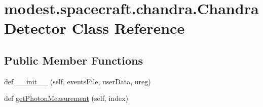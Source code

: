 \hypertarget{classmodest_1_1spacecraft_1_1chandra_1_1ChandraDetector}{}\section{modest.\+spacecraft.\+chandra.\+Chandra\+Detector Class Reference}
\label{classmodest_1_1spacecraft_1_1chandra_1_1ChandraDetector}
\subsection*{Public Member Functions}
\begin{DoxyCompactItemize}
\item 
def \hyperlink{classmodest_1_1spacecraft_1_1chandra_1_1ChandraDetector_a15d9e87637981cfaef03dfc955f081ef}{\+\_\+\+\_\+init\+\_\+\+\_\+} (self, events\+File, user\+Data, ureg)
\item 
def \hyperlink{classmodest_1_1spacecraft_1_1chandra_1_1ChandraDetector_ab4230e87a9e24ad26003b07e36578faa}{get\+Photon\+Measurement} (self, index)
\end{DoxyCompactItemize}
